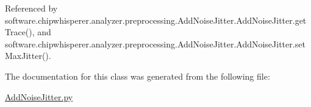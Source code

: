 Referenced by software.\+chipwhisperer.\+analyzer.\+preprocessing.\+Add\+Noise\+Jitter.\+Add\+Noise\+Jitter.\+get\+Trace(), and software.\+chipwhisperer.\+analyzer.\+preprocessing.\+Add\+Noise\+Jitter.\+Add\+Noise\+Jitter.\+set\+Max\+Jitter().



The documentation for this class was generated from the following file\+:\begin{DoxyCompactItemize}
\item 
\hyperlink{AddNoiseJitter_8py}{Add\+Noise\+Jitter.\+py}\end{DoxyCompactItemize}
